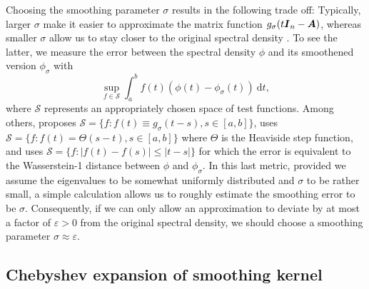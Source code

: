 \documentclass[12pt]{article}
\begin{document}
Choosing the smoothing parameter $\sigma$ results in the following trade off: Typically, larger $\sigma$ make it easier to approximate the matrix function $g_{\sigma}(t\boldsymbol{I}_n - \boldsymbol{A})$, whereas smaller $\sigma$ allow us to stay closer to the original spectral density . To see the latter, we measure the error between the spectral density $\phi$ and its smoothened version $\phi_{\sigma}$ with
\begin{equation}
    \sup_{f \in \mathcal{S}} \int_{a}^{b} f(t) (\phi(t) - \phi_{\sigma}(t))~\mathrm{d}t,
    \label{equ:error-metric}
\end{equation}
where $\mathcal{S}$ represents an appropriately chosen space of test functions. Among others, \cite{lin-2016-approximating-spectral} proposes $\mathcal{S} = \{ f: f(t) \equiv g_{\sigma}(t - s), s \in [a, b]\}$, \cite{chen-2021-analysis-stochastic} uses $\mathcal{S} = \{f : f(t) = \Theta(s - t), s \in [a, b] \}$ where $\Theta$ is the Heaviside step function, and \cite{braverman-2022-sublinear-time} uses $\mathcal{S} = \{f : |f(t) - f(s)| \leq |t - s| \}$ for which the error  is equivalent to the Wasserstein-1 distance between $\phi$ and $\phi_{\sigma}$. In this last metric, provided we assume the eigenvalues to be somewhat uniformly distributed and $\sigma$ to be rather small, a simple calculation allows us to roughly estimate the smoothing error  to be $\sigma$. Consequently, if we can only allow an approximation to deviate by at most a factor of $\varepsilon > 0$ from the original spectral density, we should choose a smoothing parameter $\sigma \approx \varepsilon$.

\subsection{Chebyshev expansion of smoothing kernel}
\label{subsec:chebyshev-expansion}
\end{document}
